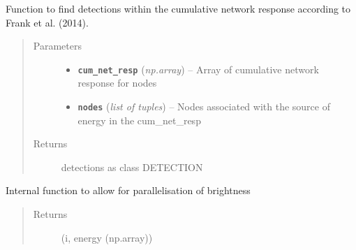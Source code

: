 \documentclass[a4paper,10pt,english]{sphinxmanual}
\begin{document}
\begin{fulllineitems}
\label{modules:bright_lights._find_detections}
Function to find detections within the cumulative network response according
to Frank et al. (2014).
\begin{quote}\begin{description}
\item[{Parameters}] \leavevmode\begin{itemize}
\item {} 
\textbf{\texttt{cum\_net\_resp}} (\emph{np.array}) -- Array of cumulative network response for nodes

\item {} 
\textbf{\texttt{nodes}} (\emph{list of tuples}) -- Nodes associated with the source of energy in the cum\_net\_resp

\end{itemize}

\item[{Returns}] \leavevmode
detections as class DETECTION

\end{description}\end{quote}

\end{fulllineitems}


\begin{fulllineitems}
\label{modules:bright_lights._node_loop}
Internal function to allow for parallelisation of brightness
\begin{quote}\begin{description}
\item[{Returns}] \leavevmode
(i, energy (np.array))

\end{description}\end{quote}

\end{fulllineitems}

\end{document}
